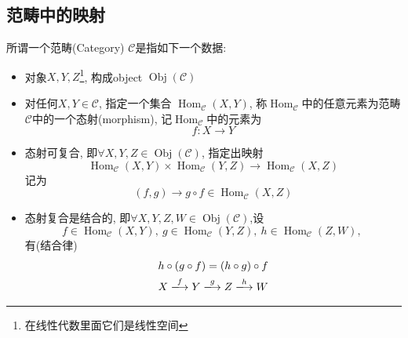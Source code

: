 
\subsection{范畴中的映射}

\begin{definition}
    所谓一个范畴(Category) $\mathcal{C}$是指如下一个数据:
    \begin{itemize}
        \item 对象$X,Y,Z$\footnote{在线性代数里面它们是线性空间}, 构成object $\operatorname{Obj}(\mathcal{C})$
        
        \item 对任何$X,Y \in \mathcal{C}$, 指定一个集合 $\operatorname{Hom}_{\mathcal{C}}(X,Y)$, 称$\operatorname{Hom}_{\mathcal{C}}$中的任意元素为范畴$\mathcal{C}$中的一个态射(morphism), 记$\operatorname{Hom}_{\mathcal{C}}$中的元素为
        \begin{equation}
          f\colon X\rightarrow Y
        \end{equation}

        \item 态射可复合, 即$\forall X,Y,Z \in \operatorname{Obj}(\mathcal{C}) $, 指定出映射
        \begin{equation}
          \operatorname{Hom}_{\mathcal{C}} (X,Y) \times \operatorname{Hom}_{\mathcal{C}}(Y,Z) \longrightarrow \operatorname{Hom}_{\mathcal{C}}(X,Z)
        \end{equation}
        记为
        \begin{equation}
          (f,g) \rightarrow g \circ f \in \operatorname{Hom}_{\mathcal{C}}(X,Z)
        \end{equation}

        \item 态射复合是结合的, 即$\forall X,Y,Z,W \in \operatorname{Obj}(\mathcal{C})$,设
        \begin{equation}
          f \in \operatorname{Hom}_{\mathcal{C}}(X,Y), \ 
          g \in \operatorname{Hom}_{\mathcal{C}}(Y,Z), \ 
          h \in \operatorname{Hom}_{\mathcal{C}}(Z,W), \ 
        \end{equation}
        有(结合律)
        \begin{gather}
            h \circ (g \circ f) = (h\circ g) \circ f
            \\
            X \xlongrightarrow{f} Y \xlongrightarrow{g} Z \xlongrightarrow{h} W
        \end{gather}


\end{itemize}
\end{definition}
